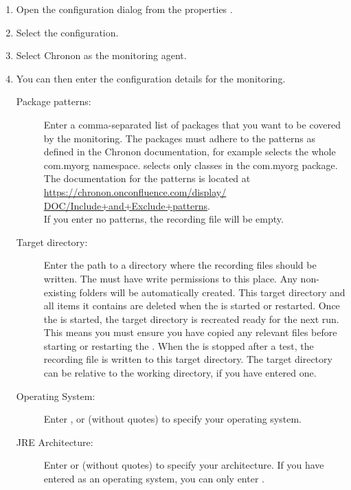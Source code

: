 \begin{enumerate}
\item Open the \gdaut{} configuration dialog from the \gdproject{} properties .
\item Select the  configuration. 
\item Select Chronon as the monitoring agent. 
\item You can then enter the configuration details for the monitoring. 
\begin{description}
\item [Package patterns:]{Enter a comma-separated list of packages that you want to be covered by the monitoring. The packages must adhere to the patterns as defined in the Chronon documentation, for example  selects the whole com.myorg namespace.  selects only classes in the com.myorg package. The documentation for the patterns is located at \\
\href{https://chronon.onconfluence.com/display/DOC/Include+and+Exclude+patterns}{https://chronon.onconfluence.com/display/\\
DOC/Include+and+Exclude+patterns}.\\
 If you enter no patterns, the recording file will be empty.}
\item [Target directory:]{Enter the path to a directory where the recording files should be written. The \gdaut{} must have write permissions to this place. Any non-existing folders will be automatically created. This target directory and all items it contains are deleted when the \gdaut{} is started or restarted. Once the \gdaut{} is started, the target directory is recreated ready for the next run. This means you must ensure you have copied any relevant files before starting or restarting the \gdaut{}. When the \gdaut{} is stopped after a test, the recording file is written to this target directory. The target directory can be relative to the \gdaut{} working directory, if you have entered one.}
\item [Operating System:]{Enter  ,  or  (without quotes) to specify your operating system. }
\item[JRE Architecture:]{Enter  or  (without quotes) to specify your architecture. If you have entered  as an operating system, you can only enter .}
\end{description}
\end{enumerate}

